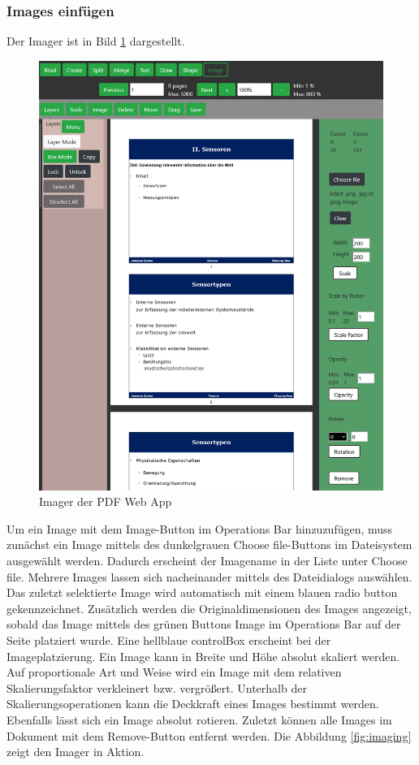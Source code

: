 \subsubsection{Images einfügen}
Der Imager ist in Bild \ref{fig:images} dargestellt. 

\begin{figure}[!htbp]
	\centering
	\includegraphics[width=1\textwidth]{"images/images.png"}
	\caption{Imager der PDF Web App}
	\label{fig:images}
\end{figure}

Um ein Image mit dem Image-Button im Operations Bar hinzuzufügen, muss zunächst ein Image mittels des dunkelgrauen Choose file-Buttons im Dateisystem ausgewählt werden. Dadurch erscheint der Imagename in der Liste unter Choose file. Mehrere Images lassen sich nacheinander mittels des Dateidialogs auswählen. Das zuletzt selektierte Image wird automatisch mit einem blauen radio button gekennzeichnet. Zusätzlich werden die Originaldimensionen des Images angezeigt, sobald das Image mittels des grünen Buttons Image im Operations Bar auf der Seite platziert wurde. Eine hellblaue controlBox erscheint bei der Imageplatzierung. Ein Image kann in Breite und Höhe absolut skaliert werden. Auf proportionale Art und Weise wird ein Image mit dem relativen Skalierungsfaktor verkleinert bzw. vergrößert. Unterhalb der Skalierungsoperationen kann die Deckkraft eines Images bestimmt werden. Ebenfalls lässt sich ein Image absolut rotieren. Zuletzt können alle Images im Dokument mit dem Remove-Button entfernt werden. Die Abbildung \ref{fig:imaging} zeigt den Imager in Aktion.


